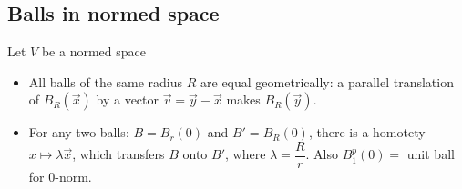 \subsection*{Balls in normed space}
\begin{proposition}{}{}
    Let $V$ be a normed space
    \begin{itemize}
        \item All balls of the same radius $R$ are equal geometrically: a parallel translation of $B_R(\vec{x})$ by a vector $\vec{v} = \vec{y} - \vec{x}$ makes $B_R(\vec{y})$.
        \item For any two balls: $B = B_r(0)$ and $B' = B_R(0)$, there is a homotety $x \longmapsto \lambda \vec{x}$, which transfers $B$ onto $B'$, where $\lambda = \dfrac{R}{r}$. Also $B_1^p(0) = $ unit ball for $0$-norm.
    \end{itemize}
\end{proposition}

